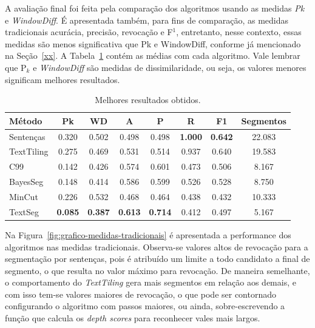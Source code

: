 

A avaliação final foi feita pela comparação dos algoritmos usando as medidas \textit{Pk} e \textit{WindowDiff}. É apresentada também, para fins de comparação, as medidas tradicionais acurácia, precisão, revocação e F$^1$, entretanto, nesse contexto, essas medidas são menos significativa que Pk e WindowDiff, conforme já mencionado na Seção~\ref{xx}. A Tabela~\ref{tab:configfinal} contém as médias com cada algoritmo. Vale lembrar que P$_k$ e \textit{WindowDiff} são medidas de dissimilaridade, ou seja, os valores menores significam melhores resultados.

\begin{table}[!h]
	\centering
\begin{tabular}{|l||c|c|c|c|c|c|c|} 
\hline 
\textbf{M\'{e}todo} & 
\textbf{Pk} & 
\textbf{WD} & 
\textbf{A } & 
\textbf{P } & 
\textbf{R } & 
\textbf{F1} & 
\textbf{Segmentos}\\ \hline

Senten\c{c}as & 0.320 & 0.502 & 0.498 & 0.498 & \textbf{1.000} & \textbf{0.642} & 22.083\\ \hline
TextTiling    & 0.275 & 0.469 & 0.531 & 0.514 & 0.937 & 0.640 & 19.583\\ \hline
C99           & 0.142 & 0.426 & 0.574 & 0.601 & 0.473 & 0.506 & 8.167\\ \hline
BayesSeg      & 0.148 & 0.414 & 0.586 & 0.599 & 0.526 & 0.528 & 8.750\\ \hline
MinCut        & 0.226 & 0.532 & 0.468 & 0.464 & 0.438 & 0.432 & 10.333\\ \hline
TextSeg       & \textbf{0.085} & \textbf{0.387} & \textbf{0.613} & \textbf{0.714} & 0.412 & 0.497 & 5.167\\ \hline
\end{tabular} 

	\caption{Melhores resultados obtidos.}
	\label{tab:configfinal}
\end{table}


Na Figura~\ref{fig:grafico-medidas-tradicionais} é apresentada a performance dos algoritmos nas medidas tradicionais. Observa-se valores altos de revocação para a segmentação por sentenças, pois é atribuído um limite a todo candidato a final de segmento, o que resulta no valor máximo para revocação. De maneira semelhante, o comportamento do \textit{TextTiling} gera 
mais segmentos em relação aos demais, e com isso tem-se valores maiores de revocação, o que pode ser contornado configurando o algoritmo com passos maiores, ou ainda, sobre-escrevendo a função que calcula os \textit{depth scores} para reconhecer vales mais largos.

